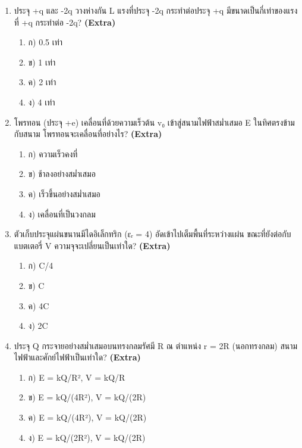 \documentclass[12pt]{article}
\begin{document}
\begin{enumerate}[label=\arabic*.]
\begin{enumerate}[label=)]
\item ก) Q²d/(2ε₀A)
\item ข) Q²d/(ε₀A)
\item ค) Q²d/(4ε₀A)
\item ง) 0
\end{enumerate}
\item ประจุ +q และ -2q วางห่างกัน L แรงที่ประจุ -2q กระทำต่อประจุ +q มีขนาดเป็นกี่เท่าของแรงที่ +q กระทำต่อ -2q? \hfill \textbf{\small (Extra)}
\begin{enumerate}[label=)]
\item ก) 0.5 เท่า
\item ข) 1 เท่า
\item ค) 2 เท่า
\item ง) 4 เท่า
\end{enumerate}
\item โพรทอน (ประจุ +e) เคลื่อนที่ด้วยความเร็วต้น v₀ เข้าสู่สนามไฟฟ้าสม่ำเสมอ E ในทิศตรงข้ามกับสนาม โพรทอนจะเคลื่อนที่อย่างไร? \hfill \textbf{\small (Extra)}
\begin{enumerate}[label=)]
\item ก) ความเร็วคงที่
\item ข) ช้าลงอย่างสม่ำเสมอ
\item ค) เร็วขึ้นอย่างสม่ำเสมอ
\item ง) เคลื่อนที่เป็นวงกลม
\end{enumerate}
\item ตัวเก็บประจุแผ่นขนานมีไดอิเล็กทริก (εᵣ = 4) อัดเข้าไปเต็มพื้นที่ระหว่างแผ่น ขณะที่ยังต่อกับแบตเตอรี่ V ความจุจะเปลี่ยนเป็นเท่าใด? \hfill \textbf{\small (Extra)}
\begin{enumerate}[label=)]
\item ก) C/4
\item ข) C
\item ค) 4C
\item ง) 2C
\end{enumerate}
\item ประจุ Q กระจายอย่างสม่ำเสมอบนทรงกลมรัศมี R ณ ตำแหน่ง r = 2R (นอกทรงกลม) สนามไฟฟ้าและศักย์ไฟฟ้าเป็นเท่าใด? \hfill \textbf{\small (Extra)}
\begin{enumerate}[label=)]
\item ก) E = kQ/R², V = kQ/R
\item ข) E = kQ/(4R²), V = kQ/(2R)
\item ค) E = kQ/(4R²), V = kQ/(2R)
\item ง) E = kQ/(2R²), V = kQ/(2R)
\end{enumerate}

\end{enumerate}
\end{document}
